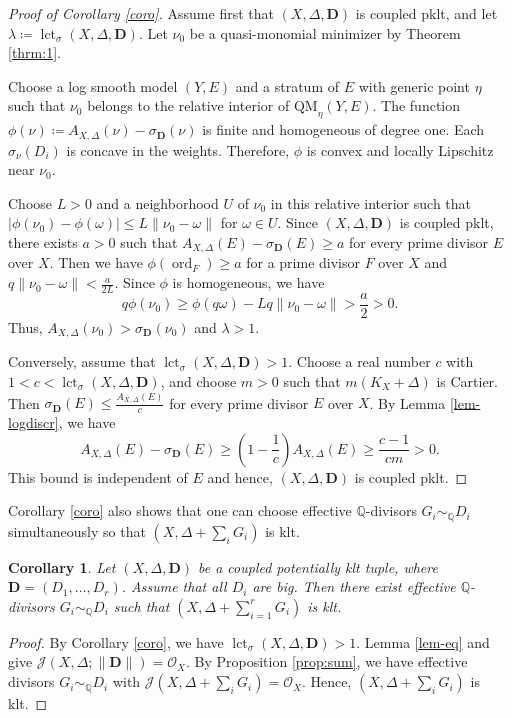 \documentclass[a4paper,12pt]{amsart}
\theoremstyle{plain}
\newtheorem{corollary}[theorem]{Corollary}
\theoremstyle{definition}
\numberwithin{equation}{section}
\newcommand{\Q}{\mathbb{Q}}
\newcommand{\OO}{\mathcal{O}}
\DeclareMathOperator{\ord}{ord}
\def\lct{\operatorname{lct}}
\begin{document}
\begin{proof}[Proof of Corollary \ref{coro}]
Assume first that $(X,\Delta,\mathbf{D})$ is coupled pklt, and let $\lambda\coloneqq \lct_{\sigma}(X,\Delta,\mathbf{D})$. Let $\nu_0$ be a quasi-monomial minimizer by Theorem \ref{thrm:1}.

Choose a log smooth model $(Y,E)$ and a stratum of $E$ with generic point $\eta$ such that $\nu_0$ belongs to the relative interior of $\mathrm{QM}_\eta(Y,E)$. The function $\phi(\nu)\coloneqq A_{X,\Delta}(\nu)-\sigma_{\mathbf{D}}(\nu)$ is finite and homogeneous of degree one. Each $\sigma_{\nu}(D_i)$ is concave in the weights. Therefore, $\phi$ is convex and locally Lipschitz near $\nu_0$.

Choose $L>0$ and a neighborhood $U$ of $\nu_0$ in this relative interior such that $|\phi(\nu_0)-\phi(\omega)|\leq L\|\nu_0-\omega\|$ for $\omega\in U$. Since $(X,\Delta,\mathbf{D})$ is coupled pklt, there exists $a>0$ such that $A_{X,\Delta}(E)-\sigma_{\mathbf{D}}(E)\geq a$ for every prime divisor $E$ over $X$. Then we have $\phi(\ord_F)\geq a$ for a prime divisor $F$ over $X$ and $q\|\nu_0-\omega\|<\frac{a}{2L}$. Since $\phi$ is homogeneous, we have
\[
q\phi(\nu_0)\geq \phi(q\omega)-Lq\|\nu_0-\omega\|>\frac{a}{2}>0.
\]
Thus, $A_{X,\Delta}(\nu_0)>\sigma_{\mathbf{D}}(\nu_0)$ and $\lambda>1$.

Conversely, assume that $\lct_{\sigma}(X,\Delta,\mathbf{D})>1$. Choose a real number $c$ with $1<c<\lct_{\sigma}(X,\Delta,\mathbf{D})$, and choose $m>0$ such that $m(K_X+\Delta)$ is Cartier. Then $\sigma_{\mathbf{D}}(E)\leq \frac{A_{X,\Delta}(E)}{c}$ for every prime divisor $E$ over $X$. By Lemma \ref{lem-logdiscr}, we have
\[
A_{X,\Delta}(E)-\sigma_{\mathbf{D}}(E)\geq \left(1-\frac{1}{c}\right)A_{X,\Delta}(E)\geq \frac{c-1}{cm}>0.
\]
This bound is independent of $E$ and hence, $(X,\Delta,\mathbf{D})$ is coupled pklt.
\end{proof}

Corollary \ref{coro} also shows that one can choose effective $\Q$-divisors $G_i\sim_{\Q}D_i$ simultaneously so that $(X,\Delta+\sum_i G_i)$ is klt.

\begin{corollary}
    Let \((X,\Delta,\mathbf{D})\) be a coupled potentially klt tuple, where \(\mathbf D=(D_1,\dots,D_r)\). Assume that all \(D_i\) are big. Then there exist effective \(\Q\)-divisors \(G_i\sim_{\Q} D_i\) such that $(X,\Delta+\sum_{i=1}^r G_i)$ is klt.
\end{corollary}
\begin{proof}
    By Corollary \ref{coro}, we have \(\lct_{\sigma}(X,\Delta,\mathbf{D})>1\). Lemma \ref{lem-eq} and \cite[Theorem 3.7]{CJKL} give \(\mathcal{J}(X,\Delta;\|\mathbf{D}\|)=\OO_X\). By Proposition \ref{prop:sum}, we have effective divisors $G_i\sim_{\Q} D_i$ with $\mathcal{J}(X,\Delta+\sum_i G_i)=\OO_X$. Hence, $(X,\Delta+\sum_i G_i)$ is klt.
\end{proof}
\end{document}
